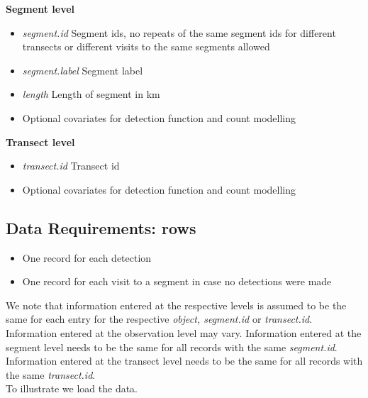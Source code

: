 \noindent \textbf{Segment level}\\
\begin{itemize}
\item{\textit{segment.id} Segment ids, no repeats of the same segment ids for different transects or different visits to the same segments allowed}\\
\item{\textit{segment.label} Segment label} \\
\item{\textit{length} Length of segment in km}\\
\item{Optional covariates for detection function and count modelling}\\
\end{itemize}

\noindent \textbf{Transect level}\\
\begin{itemize}
\item{\textit{transect.id} Transect id}\\
\item{Optional covariates for detection function and count modelling}\\
\end{itemize}

\subsection{Data Requirements: rows} 
\begin{itemize}
\item{One record for each detection}
\item{One record for each visit to a segment in case no detections were made}
\end{itemize}
\noindent We note that information entered at the respective levels is assumed to be the same for each entry for the respective \textit{object, segment.id} or \textit{transect.id}. Information entered at the observation level may vary. Information entered at the segment level needs to be the same for all records with the same \textit{segment.id}. Information entered at the transect level needs to be the same for all records with the same \textit{transect.id}. \\
To illustrate we load the data. 


